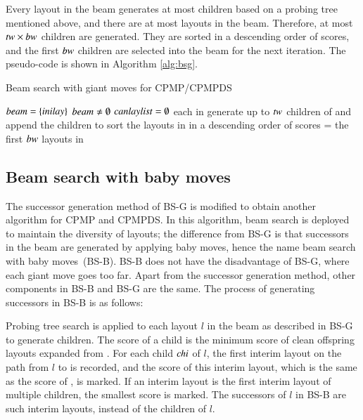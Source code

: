 \documentclass[review,3p,times,authoryear,12pt]{elsarticle}
\begin{document}
Every layout in the beam generates at most  children based on a probing tree mentioned above, and there are at most  layouts in the beam. Therefore, at most $\id{tw}\times \id{bw}$ children are generated. They are sorted in a descending order of scores, and the first $\id{bw}$ children are selected into the beam for the next iteration.
The pseudo-code is shown in Algorithm \ref{alg:bsg}.


\begin{algorithm}[htbp]
	\caption{Beam search with giant moves for CPMP/CPMPDS}
	\label{alg:bsg}
	\begin{codebox}
    \li $\id{beam} = \{\id{inilay}\}$
    \li \While $\id{beam} \neq \emptyset$
    \li \Do
        $\id{canlaylist}=\emptyset$
    \li \For each  in 
    \li     \Do
             generate up to $\id{tw}$ children of  and append the children to 
             \End
    \li     sort the layouts in  in a descending order of scores
    \li     {} = the first $\id{bw}$ layouts in 
        \End
	\end{codebox}	
\end{algorithm}

\subsection{Beam search with baby moves}

The successor generation method of BS-G is modified to obtain another algorithm for CPMP and CPMPDS. In this algorithm, beam search is deployed to maintain the diversity of layouts; the difference from BS-G is that successors in the beam are generated by applying baby moves, hence the name beam search with baby moves~(BS-B). BS-B does not have the disadvantage of BS-G, where each giant move goes too far. Apart from the successor generation method, other components in BS-B and BS-G are the same. The process of generating successors in BS-B is as follows:

Probing tree search is applied to each layout $l$ in the beam as described in BS-G to generate  children. The score of a child  is the minimum score of clean offspring layouts expanded from . For each child $\id{chi}$ of $l$, the first interim layout on the path from $l$ to  is recorded, and the score of this interim layout, which is the same as the score of , is marked. If an interim layout is the first interim layout of multiple children, the smallest score is marked. The successors of $l$ in BS-B are such interim layouts, instead of the children of $l$.
\end{document}
